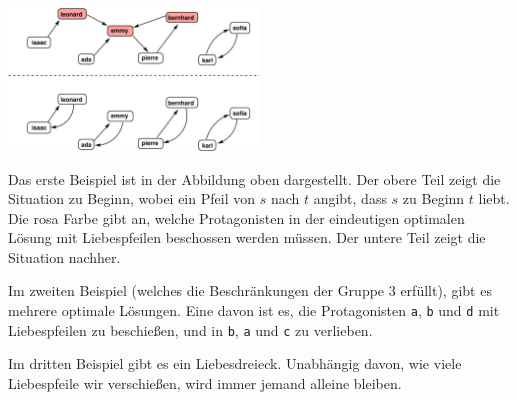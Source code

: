 \section*{\sampleexplanations}

\begin{center}
\includegraphics[width=0.5\textwidth]{polygonfig.pdf}
\end{center}

Das erste Beispiel ist in der Abbildung oben dargestellt.
Der obere Teil zeigt die Situation zu Beginn, wobei ein Pfeil von $s$ nach $t$ angibt, dass $s$ zu Beginn $t$ liebt. Die rosa Farbe gibt an, welche Protagonisten in der eindeutigen optimalen Lösung mit Liebespfeilen beschossen werden müssen.
Der untere Teil zeigt die Situation nachher.

Im zweiten Beispiel (welches die Beschränkungen der Gruppe 3 erfüllt), gibt es mehrere optimale Lösungen.
Eine davon ist es, die Protagonisten \texttt{a}, \texttt{b} und \texttt{d} mit Liebespfeilen zu beschießen, und in \texttt{b}, \texttt{a} und \texttt{c} zu verlieben.

Im dritten Beispiel gibt es ein Liebesdreieck. Unabhängig davon, wie viele Liebespfeile wir verschießen, wird immer jemand alleine bleiben.
